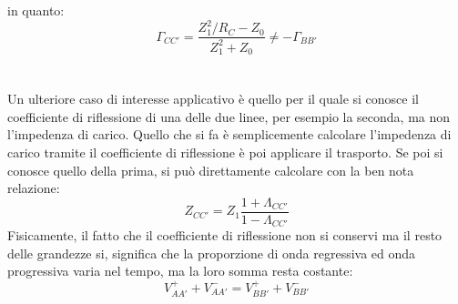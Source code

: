 \documentclass{book}
\begin{document}
    in quanto:
    \begin{equation}
        \Gamma_{CC'} = \frac{Z_{1} ^{2} /R_{C} -Z_{0}}{Z_{1} ^{2} +Z_{0}} \neq - \Gamma_{BB'}
    \end{equation}
    \\ \\
    Un ulteriore caso di interesse applicativo è quello per il quale si conosce il coefficiente di riflessione di una delle due linee, per esempio la seconda, ma 
    non l'impedenza di carico. Quello che si fa è semplicemente calcolare l'impedenza di carico tramite il coefficiente di riflessione è poi applicare il trasporto.
    Se poi si conosce quello della prima, si può direttamente calcolare con la ben nota relazione:
    \begin{equation}
        Z_{CC'} = Z_{1}\frac{1+\Lambda_{CC'}}{1-\Lambda_{CC'}}
    \end{equation}
    Fisicamente, il fatto che il coefficiente di riflessione non si conservi ma il resto delle grandezze si, significa che la proporzione di onda 
    regressiva ed onda progressiva varia nel tempo, ma la loro somma resta costante:
    \begin{equation}
        V^{+}_{AA'}+V^{-} _{AA'} = V^{+}_{BB'}+V^{-} _{BB'}
    \end{equation}
\end{document}
